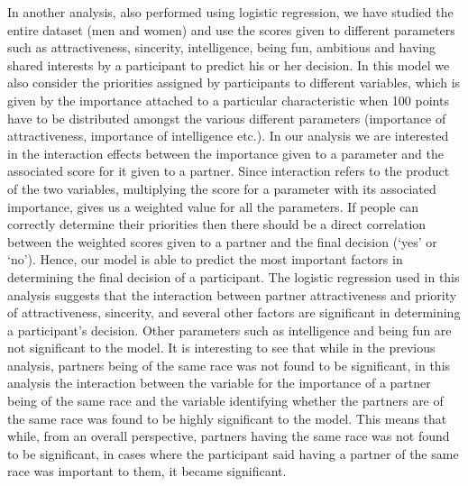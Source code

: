 \documentclass{article}
\begin{document}
In another analysis, also performed using logistic regression, we have studied the entire dataset (men and women) and use the scores given to different parameters such as attractiveness, sincerity, intelligence, being fun, ambitious and having shared interests by a participant to predict his or her decision. In this model we also consider the priorities assigned by participants to different variables, which is given by the importance attached to a particular characteristic when 100 points have to be distributed amongst the various different parameters (importance of attractiveness, importance of intelligence etc.). In our analysis we are interested in the interaction effects between the importance given to a parameter and the associated score for it given to a partner. Since interaction refers to the product of the two variables, multiplying the score for a parameter with its associated importance, gives us a weighted value for all the parameters. If people can correctly determine their priorities then there should be a direct correlation between the weighted scores given to a partner and the final decision (`yes' or `no').  Hence, our model is able to predict the most important factors in determining the final decision of a participant. The logistic regression used in this analysis suggests that the interaction between partner attractiveness and priority of attractiveness, sincerity, and several other factors are significant in determining a participant's decision.  Other parameters such as intelligence and being fun are not significant to the model. It is interesting to see that while in the previous analysis, partners being of the same race was not found to be significant, in this analysis the interaction between the variable for the importance of a partner being of the same race and the variable identifying whether the partners are of the same race was found to be highly significant to the model. This means that while, from an overall perspective, partners having the same race was not found to be significant, in cases where the participant said having a partner of the same race was important to them, it became significant.
%
\end{document}
